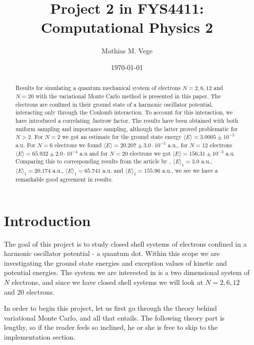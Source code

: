 \documentclass[11pt]{article}
\title{Project 2 in FYS4411: Computational Physics 2}
\author{Mathias M. Vege}
\date{\today}
\begin{document}
\maketitle

\begin{abstract}
Results for simulating a quantum mechanical system of electrons $N=2,6,12$ and $N=20$ with the variational Monte Carlo method is presented in this paper. The electrons are confined in their ground state of a harmonic oscillator potential, interacting only through the Coulomb interaction. To account for this interaction, we have introduced a correlating Jastrow factor. The results have been obtained with both uniform sampling and importance sampling, although the latter proved problematic for $N>2$. For $N=2$ we got an estimate for the ground state energy $\langle E\rangle=3.0005\pm10^{-5}$ a.u. For $N=6$ electrons we found $\langle E \rangle = 20.207\pm 3.0\cdot 10^{-5}$ a.u., for $N=12$ electrons $\langle E \rangle = 65.932\pm 2.0\cdot 10^{-4}$ a.u and for $N=20$ electrons we got $\langle E \rangle = 156.31\pm 10^{-3}$ a.u. Comparing this to corresponding results from the article by \citet{PhysRevB.84.115302}, $\langle E \rangle_1 = 3.0$ a.u., $\langle E \rangle_1 = 20.174$ a.u., $\langle E \rangle_1=65.741$ a.u. and $\langle E \rangle_1 = 155.96$ a.u., we see we have a remarkable good agreement in results.
\end{abstract}

\tableofcontents

\section{Introduction}
The goal of this project is to study closed shell systems of electrons confined in a harmonic oscillator potential - a quantum dot. Within this scope we are investigating the ground state energies and exception values of kinetic and potential energies. The system we are interested in is a two dimensional system of $N$ electrons, and since we have closed shell systems we will look at $N=2,6,12$ and $20$ electrons.

In order to begin this project, let us first go through the theory behind variational Monte Carlo, and all that entails. The following theory part is lengthy, so if the reader feels so inclined, he or she is free to skip to the implementation section.
\end{document}
